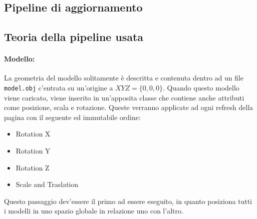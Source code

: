 \documentclass{article}
\begin{document}
\hrulefill
\subsection{Pipeline di aggiornamento}

\newpage

\subsection{Teoria della pipeline usata}
\paragraph{Modello:} La geometria del modello solitamente è descritta e contenuta dentro ad un file \texttt{model.obj} c'entrata su un'origine a $XYZ = \{0, 0, 0\}$. Quando questo modello viene caricato, viene inserito in un'apposita classe che contiene anche attributi come posizione, scala e rotazione. Queste verranno applicate ad ogni refresh della pagina con il seguente ed immutabile ordine:
\begin{itemize}
	\item Rotation X
	\item Rotation Y
	\item Rotation Z
	\item Scale and Traslation
\end{itemize}
%
Questo passaggio dev'essere il primo ad essere eseguito, in quanto posiziona tutti i modelli in uno spazio globale in relazione uno con l'altro.
\end{document}
